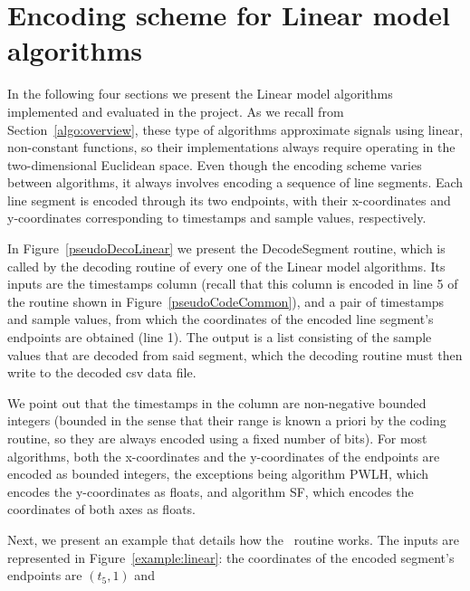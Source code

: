 
\section{Encoding scheme for Linear model algorithms}
\label{algo:decolinear}


In the following four sections we present the Linear model algorithms implemented and evaluated in the project. As we recall from Section~\ref{algo:overview}, these type of algorithms approximate signals using linear, non-constant functions, so their implementations always require operating in the two-dimensional Euclidean space. Even though the encoding scheme varies between algorithms, it always involves encoding a sequence of line segments. Each line segment is encoded through its two endpoints, with their x-coordinates and y-coordinates corresponding to timestamps and sample values, respectively.


In Figure~\ref{pseudoDecoLinear} we present the DecodeSegment routine, which is called by the decoding routine of every one of the Linear model algorithms. Its inputs are the timestamps column (recall that this column is encoded in line 5 of the routine shown in Figure~\ref{pseudoCodeCommon}), and a pair of timestamps and sample values, from which the coordinates of the encoded line segment's endpoints are obtained (line 1). The output is a list consisting of the sample values that are decoded from said segment, which the decoding routine must then write to the decoded csv data file.





We point out that the timestamps in the column are non-negative bounded integers (bounded in the sense that their range is known a priori by the coding routine, so they are always encoded using a fixed number of bits). For most algorithms, both the x-coordinates and the y-coordinates of the endpoints are encoded as bounded integers, the exceptions being algorithm PWLH, which encodes the y-coordinates as floats, and algorithm SF, which encodes the coordinates of both axes as floats.


\clearpage


Next, we present an example that details how the \decodeSegment\ routine works. The inputs are represented in Figure~\ref{example:linear}: the coordinates of the encoded segment's endpoints are $(t_5,1)$ \color{white}and\color{black}

